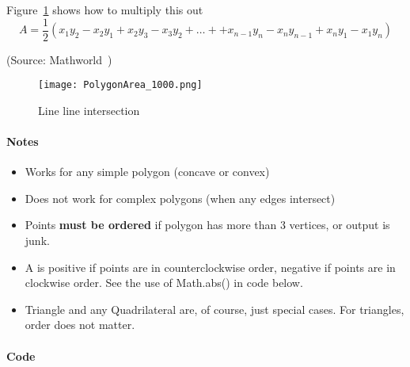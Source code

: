 Figure~\ref{fig:polygonareadeterminant} shows how to multiply this out
\[
    A = \frac{1}{2} \left(
        x_1 y_2 - x_2 y_1
      + x_2 y_3 - x_3 y_2
      + \ldots +
      + x_{n-1} y_n - x_n y_{n-1}
      + x_{n} y_1 - x_1 y_n
      \right)
\]

(Source: Mathworld~\cite{mathworldpolygonarea})

\begin{figure}
    \centering
    \texttt{[image: PolygonArea\_1000.png]}
    \caption{Line line intersection}
    \label{fig:polygonareadeterminant}
\end{figure}

\paragraph{Notes}
\begin{itemize}
\item Works for any simple polygon (concave or convex)
\item Does not work for complex polygons (when any edges intersect)
\item Points \textbf{must be ordered} if polygon has more than 3 vertices, or output is junk.
\item A is positive if points are in counterclockwise order, negative if points are in clockwise order.
    See the use of Math.abs() in code below.
\item Triangle and any Quadrilateral are, of course, just special cases.
    For triangles, order does not matter.
\end{itemize}

\paragraph{Code}
\inputminted{java}{code/polygonarea.java}

